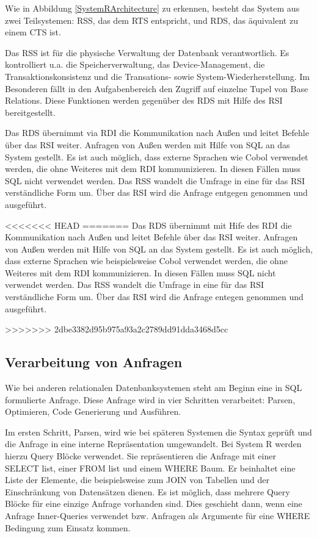 Wie in Abbildung \ref{SystemRArchitecture} zu erkennen,  besteht das System aus zwei Teilsystemen: \ac{RSS}, das dem RTS entspricht, und \ac{RDS}, das äquivalent zu einem CTS ist.

Das \ac{RSS} ist für die physische Verwaltung der Datenbank verantwortlich. Es kontrolliert u.a. die Speicherverwaltung, das Device-Management, die Transaktionskonsistenz und die Transations- sowie System-Wiederherstellung. Im Besonderen fällt in den Aufgabenbereich den Zugriff auf einzelne Tupel von Base Relations. Diese Funktionen werden gegenüber des \ac{RDS} mit Hilfe des \ac{RSI} bereitgestellt.

Das \ac{RDS} übernimmt via \ac{RDI} die Kommunikation nach Außen und leitet Befehle über das \ac{RSI} weiter. Anfragen von Außen werden mit Hilfe von \ac{SQL} an das System gestellt. Es ist auch möglich, dass externe Sprachen wie Cobol verwendet werden, die ohne Weiteres mit dem \ac{RDI} kommunizieren. In diesen Fällen muss SQL nicht verwendet werden. Das \ac{RSS} wandelt die Umfrage in eine für das \ac{RSI} verständliche Form um. Über das RSI wird die Anfrage entgegen genommen und ausgeführt.

<<<<<<< HEAD
=======
Das \ac{RDS} übernimmt mit Hife des \ac{RDI} die Kommunikation nach Außen und leitet Befehle über das \ac{RSI} weiter. Anfragen von Außen werden mit Hilfe von \ac{SQL} an das System gestellt. Es ist auch möglich, dass externe Sprachen wie beispielsweise Cobol verwendet werden, die ohne Weiteres mit dem \ac{RDI} kommunizieren. In diesen Fällen muss SQL nicht verwendet werden. Das \ac{RSS} wandelt die Umfrage in eine für das \ac{RSI} verständliche Form um. Über das RSI wird die Anfrage entegen genommen und ausgeführt.

>>>>>>> 2dbe3382d95b975a93a2c2789dd91dda3468d5cc



\subsection{Verarbeitung von Anfragen}

Wie bei anderen relationalen Datenbanksystemen steht am Beginn eine in \ac{SQL} formulierte Anfrage. Diese Anfrage wird in vier Schritten verarbeitet: Parsen,  Optimieren, Code Generierung und Ausführen.

Im ersten Schritt, Parsen, wird wie bei späteren Systemen die Syntax geprüft und die Anfrage in eine interne Repräsentation umgewandelt. Bei System R werden hierzu Query Blöcke verwendet. Sie repräsentieren die Anfrage mit einer SELECT list, einer FROM list und einem WHERE Baum. Er beinhaltet eine Liste der Elemente, die beispielsweise zum JOIN von Tabellen und der Einschränkung von Datensätzen dienen. Es ist möglich, dass mehrere Query Blöcke für eine einzige Anfrage vorhanden sind. Dies geschieht dann, wenn eine Anfrage Inner-Queries verwendet bzw. Anfragen als Argumente für eine WHERE Bedingung zum Einsatz kommen.


